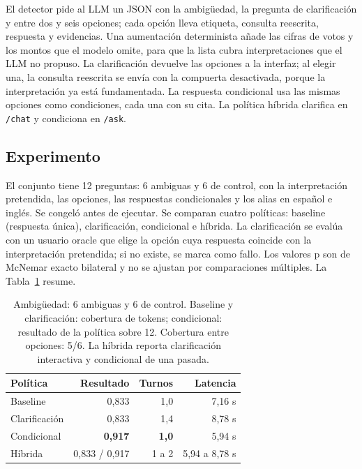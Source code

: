 El detector pide al LLM un JSON con la ambig\"uedad, la pregunta de clarificaci\'on y entre dos y seis opciones; cada opci\'on lleva etiqueta, consulta reescrita, respuesta y evidencias. Una aumentaci\'on determinista a\~nade las cifras de votos y los montos que el modelo omite, para que la lista cubra interpretaciones que el LLM no propuso. La clarificaci\'on devuelve las opciones a la interfaz; al elegir una, la consulta reescrita se env\'ia con la compuerta desactivada, porque la interpretaci\'on ya est\'a fundamentada. La respuesta condicional usa las mismas opciones como condiciones, cada una con su cita. La pol\'itica h\'ibrida clarifica en \texttt{/chat} y condiciona en \texttt{/ask}.

\subsection{Experimento}

El conjunto tiene 12 preguntas: 6 ambiguas y 6 de control, con la interpretaci\'on pretendida, las opciones, las respuestas condicionales y los alias en espa\~nol e ingl\'es. Se congel\'o antes de ejecutar. Se comparan cuatro pol\'iticas: baseline (respuesta \'unica), clarificaci\'on, condicional e h\'ibrida. La clarificaci\'on se eval\'ua con un usuario oracle que elige la opci\'on cuya respuesta coincide con la interpretaci\'on pretendida; si no existe, se marca como fallo. Los valores p son de McNemar exacto bilateral y no se ajustan por comparaciones m\'ultiples. La Tabla~\ref{tab:ambiguedad} resume.

\begin{table}[t]
\centering
\footnotesize
\caption{Ambig\"uedad: 6 ambiguas y 6 de control. Baseline y clarificaci\'on: cobertura de tokens; condicional: resultado de la pol\'itica sobre 12. Cobertura entre opciones: 5/6. La h\'ibrida reporta clarificaci\'on interactiva y condicional de una pasada.}
\label{tab:ambiguedad}
\begin{tabular}{lrrr}
\toprule
Pol\'itica & Resultado & Turnos & Latencia \\
\midrule
Baseline & 0,833 & 1,0 & 7,16 s \\
Clarificaci\'on & 0,833 & 1,4 & 8,78 s \\
Condicional & \textbf{0,917} & \textbf{1,0} & 5,94 s \\
H\'ibrida & 0,833 / 0,917 & 1 a 2 & 5,94 a 8,78 s \\
\bottomrule
\end{tabular}
\end{table}

